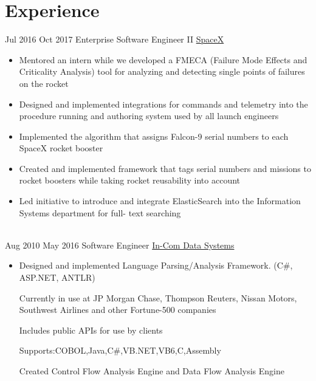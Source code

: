 \documentclass[letterpaper]{resume}
\begin{document}
	
\makeprofile %

\section{Experience}
\begin{twenty} %
	\twentyitem
	{Jul 2016}
	{Oct 2017}
	{Enterprise Software Engineer II}
	{\href{http://www.spacex.com/}{SpaceX}}
	{}
	{\begin{itemize}
		\item Mentored an intern while we developed a FMECA (Failure Mode Effects and Criticality Analysis) tool for
		analyzing and detecting single points of failures on the rocket
		
		\item Designed and implemented integrations for commands and telemetry into the procedure running and
		authoring system used by all launch engineers
		
		\item Implemented the algorithm that assigns Falcon-9 serial numbers to each SpaceX rocket booster
		
		\item Created and implemented framework that tags serial numbers and missions to rocket boosters while
		taking rocket reusability into account
		
		\item Led initiative to introduce and integrate ElasticSearch into the Information Systems department for full-
		text searching
	\end{itemize}}
	
	\\
	
	\twentyitem
	{Aug 2010}
	{May 2016}
	{Software Engineer}
	{\href{http://in-com.com/}{In-Com Data Systems}}
	{}
	{
		{\begin{itemize}
			\item Designed and implemented Language Parsing/Analysis Framework. (C\#, ASP.NET, ANTLR)
			
			\subitem Currently in use at JP Morgan Chase, Thompson Reuters, Nissan Motors, Southwest Airlines and
			other Fortune-500 companies
			
			\subitem Includes public APIs for use by clients
			
			\subitem Supports:COBOL,Java,C\#,VB.NET,VB6,C,Assembly
			
			\subitem Created Control Flow Analysis Engine and Data Flow Analysis Engine
			
		\end{itemize}}
	}
\end{twenty}
\end{document}
